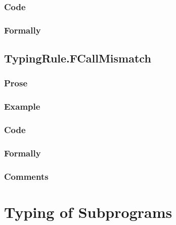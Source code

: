\documentclass{book}
\begin{document}
  \subsection{Code}

\begin{emptyformal}
    \subsection{Formally}
\end{emptyformal}


\section{TypingRule.FCallMismatch \label{sec:TypingRule.FCallMismatch}}

  \subsection{Prose}

  \subsection{Example}

  \subsection{Code}

  \subsection{Formally}

  \subsection{Comments}

\chapter{Typing of Subprograms}
\end{document}

